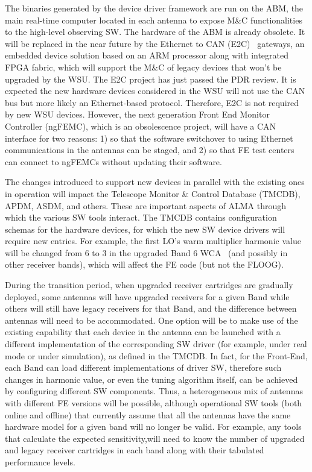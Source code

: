 The binaries generated by the device driver framework are run on the ABM, the main real-time computer located in each antenna to expose M\&C functionalities to the high-level observing SW. The hardware of the ABM is already obsolete. It will be replaced in the near future by the Ethernet to CAN (E2C)~\cite{e2cDescription} gateways, an embedded device solution based on an ARM processor along with integrated FPGA fabric, which will support the M\&C of legacy devices that won't be upgraded by the WSU. The E2C project has just passed the PDR review. It is expected the new hardware devices considered in the WSU will not use the CAN bus but more likely an Ethernet-based protocol. Therefore, E2C is not required by new WSU devices.  However, the next generation Front End Monitor Controller (ngFEMC), which is an obsolescence project, will have a CAN interface for two reasons: 1) so that the software switchover to using Ethernet communications in the antennas can be staged, and 2) so that FE test centers can connect to ngFEMCs without updating their software.

The changes introduced to support new devices in parallel with the existing ones in operation will impact the Telescope Monitor \& Control Database (TMCDB), APDM, ASDM, and others. These are important aspects of ALMA through which the various SW tools interact.  The TMCDB contains configuration schemas for the hardware devices, for which the new SW device drivers will require new entries. For example, the first LO’s warm multiplier harmonic value will be changed from 6 to 3 in the upgraded Band 6 WCA~\cite{b6up} (and possibly in other receiver bands), which will affect the FE code (but not the FLOOG).  

During the transition period, when upgraded receiver cartridges are gradually deployed, some antennas will have upgraded receivers for a given Band while others will still have legacy receivers for that Band, and the difference between antennas will need to be accommodated.  One option will be to make use of the existing capability that each device in the antenna can be launched with a different implementation of the corresponding SW driver (for example, under real mode or under simulation), as defined in the TMCDB.  In fact, for the Front-End, each Band can load different implementations of driver SW, therefore such changes in harmonic value, or even the tuning algorithm itself, can be achieved by configuring different SW components.  Thus, a heterogeneous mix of antennas with different FE versions will be possible, although operational SW tools (both online and offline) that currently assume that all the antennas have the same hardware model for a given band will no longer be valid. For example, any tools that calculate the expected sensitivity,will need to know the number of upgraded and legacy receiver cartridges in each band along with their tabulated performance levels.

